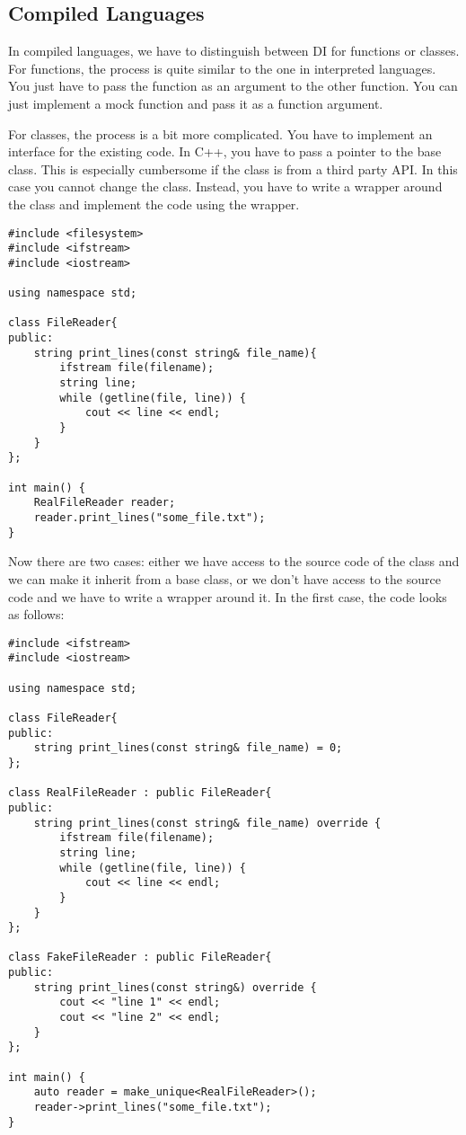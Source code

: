 \subsection{Compiled Languages}

In compiled languages, we have to distinguish between DI for functions or classes. For functions, the process is quite similar to the one in interpreted languages. You just have to pass the function as an argument to the other function. You can just implement a mock function and pass it as a function argument. 

For classes, the process is a bit more complicated. You have to implement an interface for the existing code. In C++, you have to pass a pointer to the base class. This is especially cumbersome if the class is from a third party API. In this case you cannot change the class. Instead, you have to write a wrapper around the class and implement the code using the wrapper.

\begin{programcode}{}
\begin{verbatim}
#include <filesystem>
#include <ifstream>
#include <iostream>

using namespace std; 

class FileReader{
public:
    string print_lines(const string& file_name){
        ifstream file(filename);
        string line;
        while (getline(file, line)) {
            cout << line << endl;
        }
    }
};

int main() {
    RealFileReader reader;
    reader.print_lines("some_file.txt");
}
\end{verbatim}
\end{programcode}

Now there are two cases: either we have access to the source code of the  class and we can make it inherit from a base class, or we don't have access to the source code and we have to write a wrapper around it. In the first case, the code looks as follows:


\begin{programcode}{}
\begin{verbatim}
#include <ifstream>
#include <iostream>

using namespace std; 

class FileReader{
public:
    string print_lines(const string& file_name) = 0;
};

class RealFileReader : public FileReader{
public:
    string print_lines(const string& file_name) override {
        ifstream file(filename);
        string line;
        while (getline(file, line)) {
            cout << line << endl;
        }
    }
};

class FakeFileReader : public FileReader{
public:
    string print_lines(const string&) override {
        cout << "line 1" << endl;
        cout << "line 2" << endl;
    }
};

int main() {
    auto reader = make_unique<RealFileReader>();
    reader->print_lines("some_file.txt");
}
\end{verbatim}
\end{programcode}

